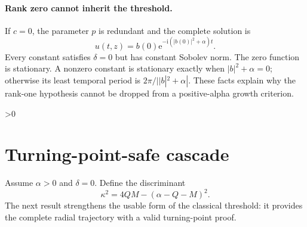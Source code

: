 \documentclass[10pt]{article}
\newcommand{\ii}{\mathrm i}
\newcommand{\e}{\mathrm e}
\begin{document}
\paragraph{Rank zero cannot inherit the threshold.}
If $c=0$, the parameter $p$ is redundant and the complete solution is
\begin{equation}
 u(t,z)=b(0)\e^{-\ii(|b(0)|^2+\alpha)t}.
 \label{eq:constant}
\end{equation}
Every constant satisfies $\delta=0$ but has constant Sobolev norm.
The zero function is stationary. A nonzero constant is stationary exactly
when $|b|^2+\alpha=0$; otherwise its least temporal period is
$2\pi/||b|^2+\alpha|$.
These facts explain why the rank-one hypothesis cannot be dropped from a
positive-alpha growth criterion.

\ifnum\CRevisionRound>0
\section{Turning-point-safe cascade}
Assume $\alpha>0$ and $\delta=0$. Define the discriminant
\begin{equation}
 \kappa^2=4QM-(\alpha-Q-M)^2.
 \label{eq:kappa}
\end{equation}
The next result strengthens the usable form of the classical threshold:
it provides the complete radial trajectory with a valid turning-point proof.
\end{document}
